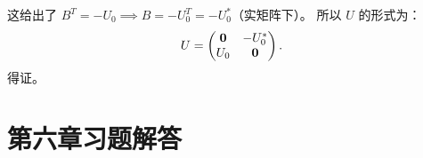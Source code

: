 \begin{exer}
这给出了 $B^T = -U_0 \implies B = -U_0^T = -U_0^*$（实矩阵下）。
所以 $U$ 的形式为：
$$ U = \begin{pmatrix} \mathbf{0} & -U_0^* \\ U_0 & \mathbf{0} \end{pmatrix}. $$
得证。



\vspace{5ex}



\end{exer}








\section*{第六章习题解答}

